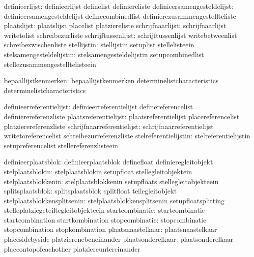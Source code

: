                definieerlijst:  definieerlijst               definelist
                                definiereliste
  definieersamengesteldelijst:  definieersamengesteldelijst  definecombinedlist
                                definierezusammengestellteliste
                  plaatslijst:  plaatslijst                  placelist
                                platziereliste
             schrijfnaarlijst:  schrijfnaarlijst             writetolist
                                schreibezurliste
           schrijftussenlijst:  schrijftussenlijst           writebetweenlist
                                schreibezwischenliste
                  stellijstin:  stellijstin                  setuplist
                                stellelisteein
     stelsamengesteldelijstin:  stelsamengesteldelijstin     setupcombinedlist
                                stellezusammengestelltelisteein

         bepaallijstkenmerken:  bepaallijstkenmerken         determinelistcharacteristics
                                determinelistcharacteristics %

     definieerreferentielijst:  definieerreferentielijst     definereferencelist
                                definierereferenzliste
        plaatsreferentielijst:  plaatsreferentielijst        placereferencelist
                                platzierereferenzliste
   schrijfnaarreferentielijst:  schrijfnaarreferentielijst   writetoreferencelist
                                schreibezurreferenzliste
        stelreferentielijstin:  stelreferentielijstin        setupreferencelist
                                stellereferenzlisteein

          definieerplaatsblok:  definieerplaatsblok          definefloat
                                definieregleitobjekt
             stelplaatsblokin:  stelplaatsblokin             setupfloat
                                stellegleitobjektein
          stelplaatsblokkenin:  stelplaatsblokkenin          setupfloats
                                stellegleitobjekteein
             splitsplaatsblok:  splitsplaatsblok             splitfloat
                                teilegleitobjekt
  stelplaatsblokkensplitsenin:  stelplaatsblokkensplitsenin  setupfloatsplitting
                                stelleplatziegeteiltegleitobjekteein
              startcombinatie:  startcombinatie              startcombination
                                startkombination
               stopcombinatie:  stopcombinatie               stopcombination
                                stopkombination
            plaatsnaastelkaar:  plaatsnaastelkaar            placesidebyside
                                platzierenebeneinander
            plaatsonderelkaar:  plaatsonderelkaar            placeontopofeachother
                                platziereuntereinander

